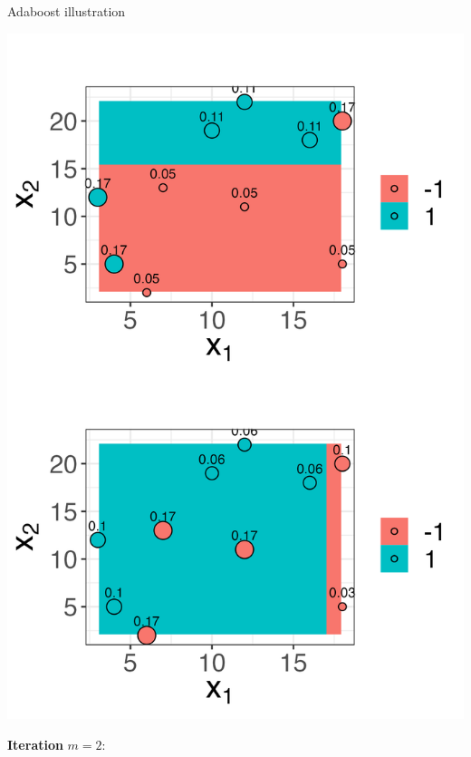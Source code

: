 \documentclass[11pt,compress,t,notes=noshow, xcolor=table]{beamer}
\begin{document}
\begin{vbframe}{Adaboost illustration}
\begin{footnotesize}
\end{footnotesize}


\framebreak

\begin{minipage}[c]{0.4\textwidth}
  \includegraphics[width = \textwidth]{figure/adaboost_viz_mlr3_2.png}
\end{minipage}%
\begin{minipage}[c]{0.05\textwidth}
  \phantom{foo}
\end{minipage}%
\begin{minipage}[c]{0.6\textwidth}
  \begin{footnotesize}
  \textbf{Iteration} $m = 2$:
  \begin{itemize}

\end{itemize}
\end{footnotesize}
\end{minipage}
\end{vbframe}
\end{document}
